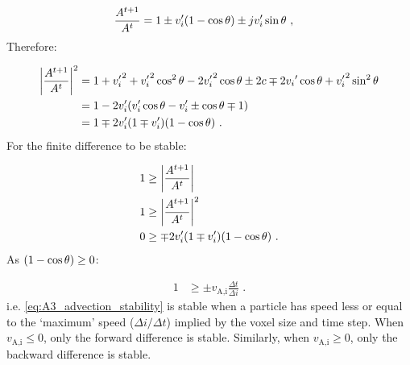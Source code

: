\begin{equation}
    \begin{aligned}
    \frac{A^{t+1}}{A^t}&=1\pm v'_i\qty(1-\cos\theta)\pm jv'_i\sin\theta\text{ ,} 
    \end{aligned}
\end{equation}
\noindent Therefore:

\begin{equation}
    \begin{aligned}
    \bigg| \frac{A^{t+1}}{A^t} \bigg|^2&=1+{v'_i}^2+{v'_i}^2\cos^2\theta - 2{v'_i}^2\cos\theta \pm 2c \mp 2{v_i}'\cos\theta + {v'_i}^2\sin^2\theta \\
    &=1-2v'_i\qty(v'_i\cos\theta -v'_i\pm \cos\theta \mp 1) \\
    &=1\mp 2v'_i\qty(1\mp v'_i)\qty(1-\cos\theta)\text{ .} 
    \end{aligned}
\end{equation}
\noindent For the finite difference to be stable:

\begin{equation}
    \begin{aligned}
    1&\geq \bigg| \frac{A^{t+1}}{A^t} \bigg|\\
    1&\geq\bigg| \frac{A^{t+1}}{A^t} \bigg|^2\\
    0&\geq \mp 2v'_i\qty(1\mp v_i')\qty(1-\cos\theta)\text{ .} 
    \end{aligned}
\end{equation}
\noindent As $\qty(1-\cos\theta)\geq 0$:

\begin{equation}
    \begin{aligned}
    1&\geq \pm v_\text{A,i}\frac{\Delta t}{\Delta i}\text{ .} 
    \end{aligned} \label{eq:A3_advection_stability}
\end{equation}
\noindent i.e. \autoref{eq:A3_advection_stability} is stable when a particle has speed less or equal to the `maximum' speed ($\Delta i/\Delta t$) implied by the voxel size and time step. When $v_\text{A,i}\leq 0$, only the forward difference is stable. Similarly, when $v_\text{A,i}\geq 0$, only the backward difference is stable.